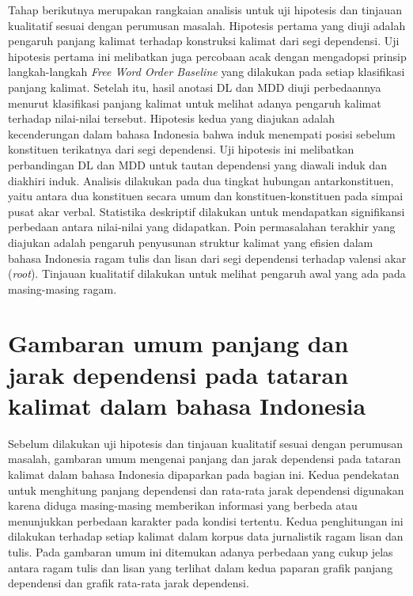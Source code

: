 Tahap berikutnya merupakan rangkaian analisis untuk uji hipotesis dan tinjauan kualitatif sesuai dengan perumusan masalah. Hipotesis pertama yang diuji adalah pengaruh panjang kalimat terhadap konstruksi kalimat dari segi dependensi. Uji hipotesis pertama ini melibatkan juga percobaan acak dengan mengadopsi prinsip langkah-langkah \textit{Free Word Order Baseline} \citep{futrell2015large} yang dilakukan pada setiap klasifikasi panjang kalimat. Setelah itu, hasil anotasi DL dan MDD diuji perbedaannya menurut klasifikasi panjang kalimat untuk melihat adanya pengaruh kalimat terhadap nilai-nilai tersebut. Hipotesis kedua yang diajukan adalah kecenderungan dalam bahasa Indonesia bahwa induk menempati posisi sebelum konstituen terikatnya dari segi dependensi. Uji hipotesis ini melibatkan perbandingan DL dan MDD untuk tautan dependensi yang diawali induk dan diakhiri induk. Analisis dilakukan pada dua tingkat hubungan antarkonstituen, yaitu antara dua konstituen secara umum dan konstituen-konstituen pada simpai pusat akar verbal. Statistika deskriptif dilakukan untuk mendapatkan signifikansi perbedaan antara nilai-nilai yang didapatkan. Poin permasalahan terakhir yang diajukan adalah pengaruh penyusunan struktur kalimat yang efisien dalam bahasa Indonesia ragam tulis dan lisan dari segi dependensi terhadap valensi akar (\textit{root}). Tinjauan kualitatif dilakukan untuk melihat pengaruh awal yang ada pada masing-masing ragam.

\section{Gambaran umum panjang dan jarak dependensi pada tataran kalimat dalam bahasa Indonesia}

Sebelum dilakukan uji hipotesis dan tinjauan kualitatif sesuai dengan perumusan masalah, gambaran umum mengenai panjang dan jarak dependensi pada tataran kalimat dalam bahasa Indonesia dipaparkan pada bagian ini. Kedua pendekatan untuk menghitung panjang dependensi dan rata-rata jarak dependensi digunakan karena diduga masing-masing memberikan informasi yang berbeda atau menunjukkan perbedaan karakter pada kondisi tertentu. Kedua penghitungan ini dilakukan terhadap setiap kalimat dalam korpus data jurnalistik ragam lisan dan tulis. Pada gambaran umum ini ditemukan adanya perbedaan yang cukup jelas antara ragam tulis dan lisan yang terlihat dalam kedua paparan grafik panjang dependensi dan grafik rata-rata jarak dependensi.

